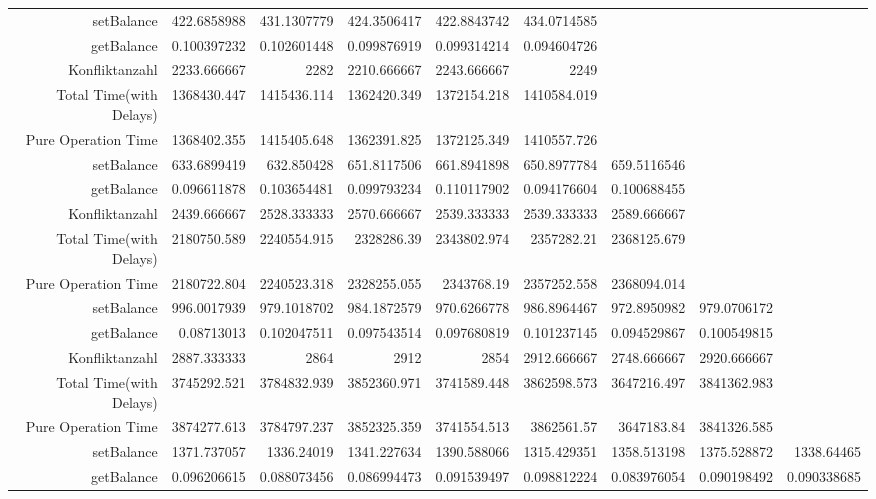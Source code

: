 \begin{landscape}
\begin{table}[htbp]
\begin{tabular}{rrrrrrrrr}
    \cline{1-9} 
    setBalance & 422.6858988 & 431.1307779 & 424.3506417 & 422.8843742 & 434.0714585 &       &       &  \\
    getBalance & 0.100397232 & 0.102601448 & 0.099876919 & 0.099314214 & 0.094604726 &       &       &  \\
    Konfliktanzahl & 2233.666667 & 2282  & 2210.666667 & 2243.666667 & 2249  &       &       &  \\
    Total Time(with Delays) & 1368430.447 & 1415436.114 & 1362420.349 & 1372154.218 & 1410584.019 &       &       &  \\
    Pure Operation Time & 1368402.355 & 1415405.648 & 1362391.825 & 1372125.349 & 1410557.726 &       &       &  \\
\cline{1-9}     
    setBalance & 633.6899419 & 632.850428 & 651.8117506 & 661.8941898 & 650.8977784 & 659.5116546 &       &  \\
    getBalance & 0.096611878 & 0.103654481 & 0.099793234 & 0.110117902 & 0.094176604 & 0.100688455 &       &  \\
    Konfliktanzahl & 2439.666667 & 2528.333333 & 2570.666667 & 2539.333333 & 2539.333333 & 2589.666667 &       &  \\
    Total Time(with Delays) & 2180750.589 & 2240554.915 & 2328286.39 & 2343802.974 & 2357282.21 & 2368125.679 &       &  \\
    Pure Operation Time & 2180722.804 & 2240523.318 & 2328255.055 & 2343768.19 & 2357252.558 & 2368094.014 &       &  \\
\cline{1-9}     
    setBalance & 996.0017939 & 979.1018702 & 984.1872579 & 970.6266778 & 986.8964467 & 972.8950982 & 979.0706172 &  \\
    getBalance & 0.08713013 & 0.102047511 & 0.097543514 & 0.097680819 & 0.101237145 & 0.094529867 & 0.100549815 &  \\
    Konfliktanzahl & 2887.333333 & 2864  & 2912  & 2854  & 2912.666667 & 2748.666667 & 2920.666667 &  \\
    Total Time(with Delays) & 3745292.521 & 3784832.939 & 3852360.971 & 3741589.448 & 3862598.573 & 3647216.497 & 3841362.983 &  \\
    Pure Operation Time & 3874277.613 & 3784797.237 & 3852325.359 & 3741554.513 & 3862561.57 & 3647183.84 & 3841326.585 &  \\
\cline{1-9}     
    setBalance & 1371.737057 & 1336.24019 & 1341.227634 & 1390.588066 & 1315.429351 & 1358.513198 & 1375.528872 & 1338.64465 \\
    getBalance & 0.096206615 & 0.088073456 & 0.086994473 & 0.091539497 & 0.098812224 & 0.083976054 & 0.090198492 & 0.090338685 \\

\end{tabular}
\end{table}
\end{landscape}
